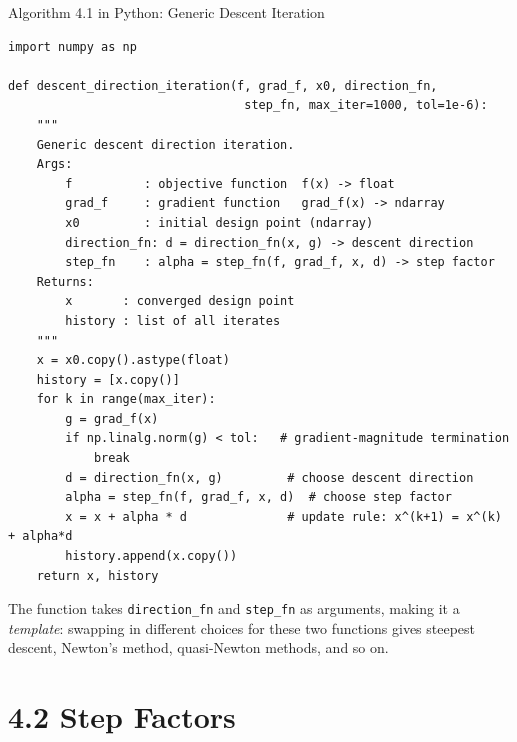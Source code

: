 \documentclass[aspectratio=169,10pt]{beamer}
\begin{document}
\begin{frame}[fragile]{Algorithm 4.1 in Python: Generic Descent Iteration}

\begin{lstlisting}[style=pycode]
import numpy as np

def descent_direction_iteration(f, grad_f, x0, direction_fn,
                                 step_fn, max_iter=1000, tol=1e-6):
    """
    Generic descent direction iteration.
    Args:
        f          : objective function  f(x) -> float
        grad_f     : gradient function   grad_f(x) -> ndarray
        x0         : initial design point (ndarray)
        direction_fn: d = direction_fn(x, g) -> descent direction
        step_fn    : alpha = step_fn(f, grad_f, x, d) -> step factor
    Returns:
        x       : converged design point
        history : list of all iterates
    """
    x = x0.copy().astype(float)
    history = [x.copy()]
    for k in range(max_iter):
        g = grad_f(x)
        if np.linalg.norm(g) < tol:   # gradient-magnitude termination
            break
        d = direction_fn(x, g)         # choose descent direction
        alpha = step_fn(f, grad_f, x, d)  # choose step factor
        x = x + alpha * d              # update rule: x^(k+1) = x^(k) + alpha*d
        history.append(x.copy())
    return x, history
\end{lstlisting}

\medskip
The function takes \texttt{direction\_fn} and \texttt{step\_fn} as
arguments, making it a \emph{template}: swapping in different choices
for these two functions gives steepest descent, Newton's method,
quasi-Newton methods, and so on.

\end{frame}

\section{4.2 Step Factors}
\end{document}
